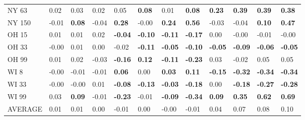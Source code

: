 \begin{tabular}{llllllllllll}
NY 63 & 0.02 & 0.03 & 0.02 & 0.05 & \textbf{0.08} & 0.01 & \textbf{0.08} & \textbf{0.23} & \textbf{0.39} & \textbf{0.39} & \textbf{0.38} \\
NY 150 & -0.01 & \textbf{0.08} & -0.04 & \textbf{0.28} & -0.00 & \textbf{0.24} & \textbf{0.56} & -0.03 & -0.04 & \textbf{0.10} & \textbf{0.47} \\
OH 15 & 0.01 & 0.01 & 0.02 & \textbf{-0.04} & \textbf{-0.10} & \textbf{-0.11} & \textbf{-0.17} & 0.00 & -0.00 & -0.01 & -0.00 \\
OH 33 & -0.00 & 0.01 & 0.00 & -0.02 & \textbf{-0.11} & \textbf{-0.05} & \textbf{-0.10} & \textbf{-0.05} & \textbf{-0.09} & \textbf{-0.06} & \textbf{-0.05} \\
OH 99 & 0.01 & 0.02 & -0.03 & \textbf{-0.16} & \textbf{0.12} & \textbf{-0.11} & \textbf{-0.23} & 0.03 & -0.02 & 0.05 & 0.05 \\
WI 8 & -0.00 & -0.01 & -0.01 & \textbf{0.06} & 0.00 & \textbf{0.03} & \textbf{0.11} & \textbf{-0.15} & \textbf{-0.32} & \textbf{-0.34} & \textbf{-0.34} \\
WI 33 & -0.00 & -0.00 & 0.01 & \textbf{-0.08} & \textbf{-0.13} & \textbf{-0.03} & \textbf{-0.18} & 0.00 & \textbf{-0.18} & \textbf{-0.27} & \textbf{-0.28} \\
WI 99 & 0.03 & \textbf{0.09} & -0.01 & \textbf{-0.23} & -0.01 & \textbf{-0.09} & \textbf{-0.34} & \textbf{0.09} & \textbf{0.35} & \textbf{0.62} & \textbf{0.69} \\
AVERAGE & 0.01 & 0.01 & 0.00 & -0.01 & 0.00 & -0.00 & -0.01 & 0.04 & 0.07 & 0.08 & 0.10 \\
\bottomrule
\end{tabular}
